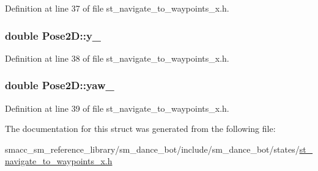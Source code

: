 Definition at line 37 of file st\+\_\+navigate\+\_\+to\+\_\+waypoints\+\_\+x.\+h.

\subsubsection[{\texorpdfstring{y\+\_\+}{y_}}]{\setlength{\rightskip}{0pt plus 5cm}double Pose2\+D\+::y\+\_\+}\hypertarget{structPose2D_a2c31f84b294702b4a82a2c9f44451d54}{}\label{structPose2D_a2c31f84b294702b4a82a2c9f44451d54}


Definition at line 38 of file st\+\_\+navigate\+\_\+to\+\_\+waypoints\+\_\+x.\+h.

\subsubsection[{\texorpdfstring{yaw\+\_\+}{yaw_}}]{\setlength{\rightskip}{0pt plus 5cm}double Pose2\+D\+::yaw\+\_\+}\hypertarget{structPose2D_a3f0f263a49f611369bcfb06ca9cd5a4d}{}\label{structPose2D_a3f0f263a49f611369bcfb06ca9cd5a4d}


Definition at line 39 of file st\+\_\+navigate\+\_\+to\+\_\+waypoints\+\_\+x.\+h.



The documentation for this struct was generated from the following file\+:\begin{DoxyCompactItemize}
\item 
smacc\+\_\+sm\+\_\+reference\+\_\+library/sm\+\_\+dance\+\_\+bot/include/sm\+\_\+dance\+\_\+bot/states/\hyperlink{st__navigate__to__waypoints__x_8h}{st\+\_\+navigate\+\_\+to\+\_\+waypoints\+\_\+x.\+h}\end{DoxyCompactItemize}

